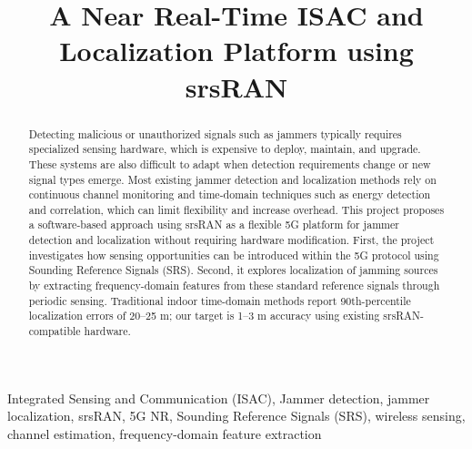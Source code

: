 \documentclass[conference]{IEEEtran}
\begin{document}
\title{A Near Real-Time ISAC and Localization Platform using srsRAN\\}

\author{
\and
{}
\and
{}
\and
}

\maketitle

\begin{abstract}
Detecting malicious or unauthorized signals such as jammers typically requires specialized sensing hardware, which is expensive to deploy, maintain, and upgrade. These systems are also difficult to adapt when detection requirements change or new signal types emerge. Most existing jammer detection and localization methods rely on continuous channel monitoring and time-domain techniques such as energy detection and correlation, which can limit flexibility and increase overhead. This project proposes a software-based approach using srsRAN as a flexible 5G platform for jammer detection and localization without requiring hardware modification. First, the project investigates how sensing opportunities can be introduced within the 5G protocol using Sounding Reference Signals (SRS). Second, it explores localization of jamming sources by extracting frequency-domain features from these standard reference signals through periodic sensing. Traditional indoor time-domain methods report 90th-percentile localization errors of 20–25 m; our target is 1–3 m accuracy using existing srsRAN-compatible hardware.
\end{abstract}

\begin{IEEEkeywords}
Integrated Sensing and Communication (ISAC), Jammer detection, jammer localization, srsRAN, 5G NR, Sounding Reference Signals (SRS), wireless sensing, channel estimation, frequency-domain feature extraction

\end{IEEEkeywords}
\end{document}
